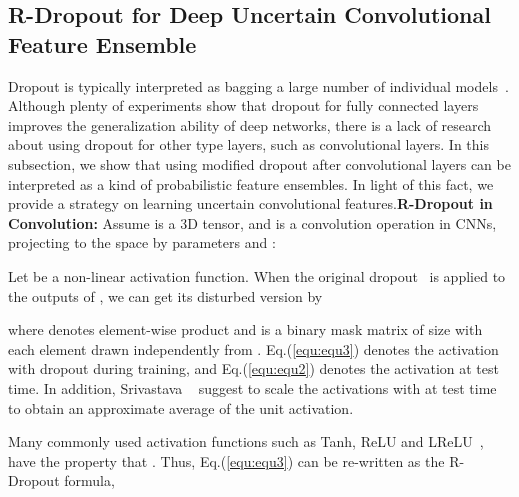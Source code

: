 \documentclass[10pt,twocolumn,letterpaper]{article}
\begin{document}
\subsection{R-Dropout for Deep Uncertain Convolutional \\Feature Ensemble}
Dropout is typically interpreted as bagging a large number of individual models~\cite{hinton2012improving,srivastava2014dropout}.
Although plenty of experiments show that dropout for fully connected layers improves the generalization ability of deep networks, there is a lack of research about using dropout for other type layers, such as convolutional layers.
In this subsection, we show that using modified dropout after convolutional layers can be interpreted as a kind of probabilistic feature ensembles. In light of this fact, we provide a strategy on learning uncertain convolutional features.{\flushleft\textbf{R-Dropout in Convolution:}} Assume  is a 3D tensor, and  is a convolution operation in CNNs, projecting  to the  space by parameters  and :
\vspace{-5mm}

Let  be a non-linear activation function. When the original dropout~\cite{hinton2012improving} is applied to the outputs of , we can get its disturbed version  by
\vspace{-1.5mm}

\vspace{-7mm}

where  denotes element-wise product and  is a binary mask matrix of size  with each element  drawn independently from .
Eq.(\ref{equ:equ3}) denotes the activation with dropout during training, and Eq.(\ref{equ:equ2}) denotes the activation at test time.
In addition, Srivastava \etal~\cite{srivastava2014dropout} suggest to scale the activations  with  at test time to obtain an approximate average of the unit activation.

Many commonly used activation functions such as Tanh, ReLU and LReLU~\cite{he2015delving}, have the property that .
Thus, Eq.(\ref{equ:equ3}) can be re-written as the R-Dropout formula,
\vspace{-1.5mm}
\end{document}
